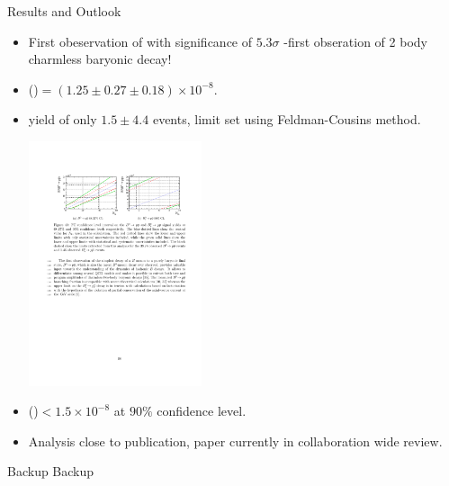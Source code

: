 \documentclass{beamer}
\def\LbpkEtapr {\decay{\Lb}{\proton\kaon\etapr}\xspace}
\begin{document}
\begin{frame}{Results and Outlook}
  \begin{itemize}
  \item First obeservation of \decay{\Bd}{\proton \antiproton} with significance of $5.3\sigma$ -first obseration of 2 body charmless baryonic \Bd decay!
  \item \BF(\decay{\Bd}{\proton \antiproton})$ = (1.25\pm0.27\pm0.18) \times 10^{-8}$.
  \item \decay{\Bs}{\proton \antiproton} yield of only $1.5\pm4.4$ events, limit set using Feldman-Cousins method.
    \begin{center}
      \includegraphics[width=0.4\textwidth]{PPBarFC.pdf}
    \end{center}
  \item \BF(\decay{\Bs}{\proton \antiproton})$ < 1.5 \times 10^{-8} $ at $90\%$ confidence level.
  \item Analysis close to publication, paper currently in collaboration wide review.
  \end{itemize}
\end{frame}

\begin{frame}
  {\centering \Huge \LbpkEtapr }
\end{frame}

  
\appendix
\begin{frame}{Backup}
  Backup
\end{frame}
\end{document}
